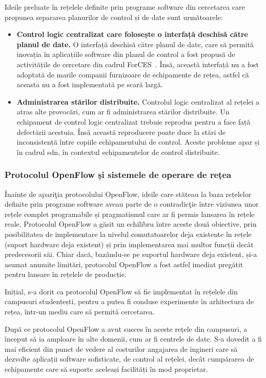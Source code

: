 Ideile preluate în rețelele definite prin programe software din cercetarea care propunea separarea planurilor de control și de date sunt următoarele:
\begin{itemize}
	\item \textbf{Control logic centralizat care folosește o interfață deschisă către planul de date.} O interfață deschisă către planul de date, care să permită inovația în aplicațiile software din planul de control a fost propusă de activitățile de cercetare din cadrul ForCES~\cite{haleplidis2015network}. Însă, această interfață nu a fost adoptată de marile companii furnizoare de echipamente de rețea, astfel că aceasta nu a fost implementată pe scară largă.
	\item \textbf{Administrarea stărilor distribuite.} Controlul logic centralizat al rețelei a atras alte provocări, cum ar fi administrarea stărilor distribuite. Un echipament de control logic centralizat trebuie reprodus pentru a face față defectării acestuia. Însă această reproducere poate duce la stări de inconsistență între copiile echipamentului de control. Aceste probleme apar și în cadrul \gls{sdn}, în contextul echipamentelor de control distribuite.
\end{itemize}

\subsubsection{Protocolul OpenFlow și sistemele de operare de rețea}

Înainte de apariţia protocolului OpenFlow, ideile care stăteau la baza rețelelor definite prin programe software aveau parte de o contradicţie între viziunea unor rețele complet programabile și pragmatismul care ar fi permis lansarea în rețele reale. Protocolul OpenFlow a găsit un echilibru între aceste două obiective, prin posibilitatea de implementare la nivelul comutatoarelor deja existente în rețele (suport hardware deja existent) și prin implementarea mai multor funcții decât predecesorii săi. Chiar dacă, bazându-se pe suportul hardware deja existent, și-a asumat anumite limitări, protocolul OpenFlow a fost astfel imediat pregătit pentru lansare în rețelele de producție.

Inițial, s-a dorit ca protocolul OpenFlow să fie implementat în rețelele din campusuri studențești, pentru a putea fi conduse experimente în arhitectura de rețea, într-un mediu care să permită cercetarea.

După ce protocolul OpenFlow a avut succes în aceste rețele din campusuri, a început să ia amploare în alte domenii, cum ar fi centrele de date. S-a dovedit a fi mai eficient din punct de vedere al costurilor angajarea de ingineri care să dezvolte aplicații software sofisticate, de control al rețelei, decât cumpărarea de echipamente care să suporte aceleași facilități în mod proprietar.

